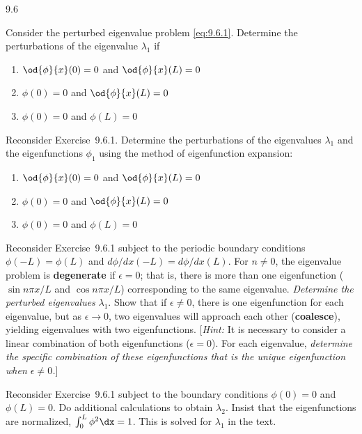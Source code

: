 \begin{exercises}{9.6}

\item Consider the perturbed eigenvalue problem \eqref{eq:9.6.1}.  Determine the perturbations of the eigenvalue $\lambda_1$ if
\begin{enumerate}
\item[(a)] $\od{\phi}{x}(0) = 0$ and $\od{\phi}{x}(L) = 0$
\item[(b)] $\phi(0) = 0$ and $\od{\phi}{x}(L) = 0$
\item[(c)] $\phi(0) = 0$ and $\phi(L) = 0$
\end{enumerate}

\item Reconsider Exercise~9.6.1.  Determine the perturbations of the eigenvalues $\lambda_1$ and the eigenfunctions $\phi_1$ using the method of eigenfunction expansion:
\begin{enumerate}
\item[(a)] $\od{\phi}{x}(0) = 0$ and $\od{\phi}{x}(L) = 0$
\item[(b)] $\phi(0) = 0$ and $\od{\phi}{x}(L) = 0$
\item[(c)] $\phi(0) = 0$ and $\phi(L) = 0$
\end{enumerate}

\item Reconsider Exercise~9.6.1 subject to the periodic boundary conditions $\phi(-L) = \phi(L)$ and $d\phi/dx(-L) = d\phi/dx(L)$.  For $n \neq 0$, the eigenvalue problem is \textbf{degenerate} if $\epsilon = 0$; that is, there is more than one eigenfunction ($\sin n\pi x/L$ and $\cos n\pi x/L$) corresponding to the same eigenvalue.  \emph{Determine the perturbed eigenvalues} $\lambda_1$.  Show that if $\epsilon \neq 0$, there is one eigenfunction for each eigenvalue, but as $\epsilon \to 0$, two eigenvalues will approach each other (\textbf{coalesce}), yielding eigenvalues with two eigenfunctions.  [\textit{Hint:} It is necessary to consider a linear combination of both eigenfunctions ($\epsilon = 0$).  For each eigenvalue, \emph{determine the specific combination of these eigenfunctions that is the unique eigenfunction when $\epsilon \neq 0$.}]

\item Reconsider Exercise~9.6.1 subject to the boundary conditions $\phi(0) = 0$ and $\phi(L) = 0$.  Do additional calculations to obtain $\lambda_2$.  Insist that the eigenfunctions are normalized, $\int_0^L\phi^2\dx = 1$.  This is solved for $\lambda_1$ in the text.


\end{exercises}
